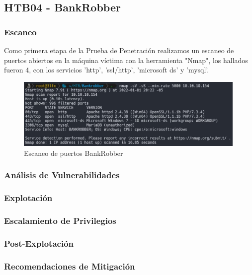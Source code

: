 \subsection{HTB04 - BankRobber}

    \subsubsection{Escaneo}
        \large{Como primera etapa de la Prueba de Penetración realizamos un escaneo de puertos abiertos en la máquina víctima con la herramienta "Nmap", los hallados fueron 4, con los servicios 'http', 'ssl/http', 'microsoft ds' y 'mysql'.}
        \par
        \begin{figure}[h!]
            \centering
            \includegraphics[width=0.99\textwidth]{informe4/imagenes/bankrobber/01_escaneo.png}
            \caption{Escaneo de puertos BankRobber} 
        \end{figure}  

    \subsubsection{Análisis de Vulnerabilidades}

    \subsubsection{Explotación}

    \subsubsection{Escalamiento de Privilegios}

    \subsubsection{Post-Explotación}

    \subsubsection{Recomendaciones de Mitigación}